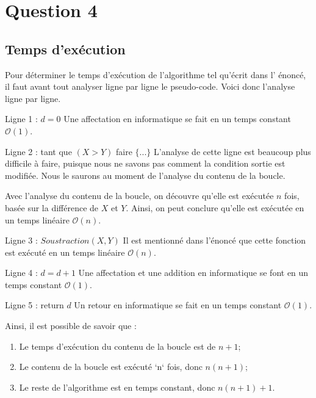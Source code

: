 \documentclass[12pt]{article}
\begin{document}
  \newpage

  \section*{Question 4}
	\subsection*{Temps d'exécution}
    Pour déterminer le temps d'exécution de l'algorithme tel qu'écrit dans l'
    énoncé, il faut avant tout analyser ligne par ligne le pseudo-code. Voici
    donc l'analyse ligne par ligne. \newline

    Ligne 1 : \( d = 0 \) \newline
    Une affectation en informatique se fait en un temps constant
    \( \mathcal{O}(1) \). \newline

    Ligne 2 : tant que \( (X > Y) \) faire \( \{ ... \} \) \newline
    L'analyse de cette ligne est beaucoup plus difficile à faire, puisque nous
	  ne savons pas comment la condition sortie est modifiée. Nous le saurons au
    moment de l'analyse du contenu de la boucle. \newline

  	Avec l'analyse du contenu de la boucle, on découvre qu'elle est exécutée
  	\( n \) fois, basée sur la différence de \( X \) et \( Y \). Ainsi, on peut
    conclure qu'elle est exécutée en un temps linéaire \( \mathcal{O}(n) \).
    \newline

    Ligne 3 : \( Soustraction(X, Y) \) \newline
    Il est mentionné dans l'énoncé que cette fonction est exécuté en un temps
	  linéaire \( \mathcal{O}(n) \). \newline

    Ligne 4 : \( d = d + 1 \) \newline
    Une affectation et une addition en informatique se font en un temps constant
    \( \mathcal{O}(1) \). \newline

    Ligne 5 : return \( d \) \newline
  	Un retour en informatique se fait en un temps constant
    \( \mathcal{O}(1) \). \newline

    \noindent Ainsi, il est possible de savoir que :
    \begin{enumerate}
      \item Le temps d'exécution du contenu de la boucle est de \( n + 1 \);
      \item Le contenu de la boucle est exécuté `n` fois, donc \( n(n + 1) \);
      \item Le reste de l'algorithme est en temps constant, donc
       \( n(n + 1) + 1 \).
    \end{enumerate}
\end{document}
